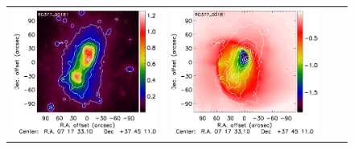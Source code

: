 \documentclass[twocolumn,traditabstract]{aa}
\begin{document}
\begin{figure}[h]
{\begin{tabular}{llll}
\includegraphics[trim=0cm 2.2cm 0cm 0cm, clip=true, scale=1]{Figure/Map_RG377_00181_DMmap_zproj_zobs0p5_raw.pdf} & 
\includegraphics[trim=2.3cm 2.2cm 0cm 0cm, clip=true, scale=1]{Figure/Map_RG377_00181_Ymap_zobs0p5_raw.pdf} & 

\end{tabular}}
\end{figure}
\end{document}
